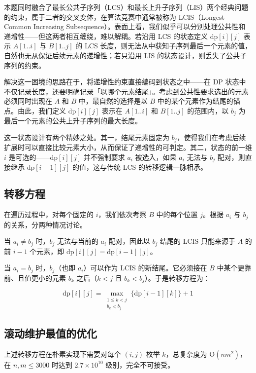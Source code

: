 \documentclass[12pt, a4paper]{academics}
\begin{document}
本题同时融合了最长公共子序列（LCS）和最长上升子序列（LIS）两个经典问题的约束，属于二者的交叉变体，在算法竞赛中通常被称为 LCIS（Longest Common Increasing Subsequence）。表面上看，我们似乎可以分别处理公共性和递增性——但这两者相互缠绕，难以解耦。若沿用 LCS 的状态定义 $\mathrm{dp}[i][j]$ 表示 $A[1..i]$ 与 $B[1..j]$ 的 LCS 长度，则无法从中获知子序列最后一个元素的值，自然也无从保证后续元素的递增性；若只沿用 LIS 的状态设计，则丢失了公共子序列的约束。

解决这一困境的思路在于，将递增性约束直接编码到状态之中——在 DP 状态中不仅记录长度，还要明确记录「以哪个元素结尾」。考虑到公共性要求选出的元素必须同时出现在 $A$ 和 $B$ 中，最自然的选择是以 $B$ 中的某个元素作为结尾的锚点。由此，我们定义 $\mathrm{dp}[i][j]$ 表示在 $A[1..i]$ 和 $B[1..j]$ 的范围内，以 $b_j$ 为最后一个元素的公共上升子序列的最大长度。

这一状态设计有两个精妙之处。其一，结尾元素固定为 $b_j$，使得我们在考虑后续扩展时可以直接比较元素大小，从而保证了递增性的可判定。其二，状态的前一维 $i$ 是可选的——$\mathrm{dp}[i][j]$ 并不强制要求 $a_i$ 被选入，如果 $a_i$ 无法与 $b_j$ 配对，则直接继承 $\mathrm{dp}[i-1][j]$ 的值，这与传统 LCS 的转移逻辑一脉相承。

\subsection{转移方程}

在遍历过程中，对每个固定的 $i$，我们依次考察 $B$ 中的每个位置 $j$。根据 $a_i$ 与 $b_j$ 的关系，分两种情况讨论。

当 $a_i \neq b_j$ 时，$b_j$ 无法与当前的 $a_i$ 配对，因此以 $b_j$ 结尾的 LCIS 只能来源于 $A$ 的前 $i-1$ 个元素，即 $\mathrm{dp}[i][j] = \mathrm{dp}[i-1][j]$。

当 $a_i = b_j$ 时，$b_j$（也即 $a_i$）可以作为 LCIS 的新结尾。它必须接在 $B$ 中某个更靠前、且值更小的元素 $b_k$ 之后（$k < j$ 且 $b_k < b_j$）。于是转移方程为：

\[
\mathrm{dp}[i][j] = \max_{\substack{1 \le k < j \\ b_k < b_j}}\{\mathrm{dp}[i-1][k]\} + 1
\]

\subsection{滚动维护最值的优化}

上述转移方程在朴素实现下需要对每个 $(i, j)$ 枚举 $k$，总复杂度为 $\mathrm{O}(nm^2)$，在 $n, m \le 3000$ 时达到 $2.7 \times 10^{10}$ 级别，完全不可接受。
\end{document}
